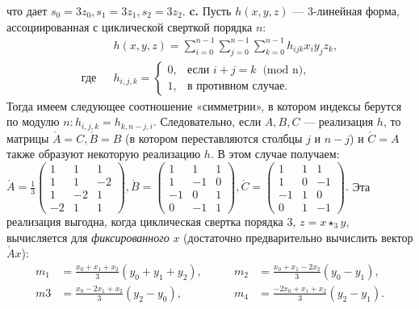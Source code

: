 \documentclass{../../template/mai_book}
\begin{document}
\noindent
что дает $s_0 = 3z_0 , s_1 = 3z_1 , s_2 = 3z_2$. \newline 
\indent \textbf{c.} Пусть $h(x,y,z)$ --- 3-линейная форма, ассоциированная с цикли­ческой сверткой порядка $n:$ \newline
\begin{align*}
&h(x,y,z) = \sum_{i=0}^{n-1} \sum_{j=0}^{n-1} \sum_{k=0}^{n-1} h_{ijk} x_i y_{j} z_k, \\
\text{где} \; \; \, &h_{i,j,k} = \begin{cases}
0, & \text{если $i+j = k \: $ (mod n)}, \\
1, & \text{в противном случае}.
\end{cases}
\end{align*}
Тогда имеем следующее соотношение «симметрии», в котором индексы 
берутся по модулю $n: h_{i,j,k} = h_{k,n-j,i}$. Следовательно, если $A, B, C$ --- реализация $h$, то матрицы $\acute A = C, \acute B = B$ (в котором переставляются столбцы $j$ и $n - j$) и $\acute C = A$ также образуют некоторую реализацию $h$. В этом случае получаем: \newline
$\acute A = \frac{1}3 \begin{pmatrix}
1 & 1 & 1 \\
1 & 1 & -2 \\         
1 & -2 & 1\\
-2 & 1 & 1
\end{pmatrix} ,
\acute B = \begin{pmatrix}
1 & 1 & 1 \\
1 & -1 & 0 \\         
-1 & 0 & 1\\
0 & -1 & 1
\end{pmatrix} ,
\acute C = \begin{pmatrix}
1 & 1 & 1 \\
1 & 0 & -1 \\         
-1 & 1 & 0\\
0 & 1 & -1
\end{pmatrix} . $ \newline
Эта реализация выгодна, когда циклическая свертка порядка 3, $z = x\star_3 y$, вычисляется для {\itshape фиксированного} $x$ (достаточно предварительно вычислить вектор $\acute A x$):
\begin{align*}
m_1 &= \frac{x_0 + x_1 + x_2}3 (y_0 + y_1 + y_2), &\qquad m_2
&= \frac{x_0 + x_1 -2x_2}3 (y_0 - y_1),\\
m3 &= \frac{x_0 -2x_1 + x_2}3 (y_2 - y_0),   &\qquad m_4 &= \frac{-2x_0 + x_1 + x_2}3 (y_2 - y_1).
\end{align*}
\end{document}
